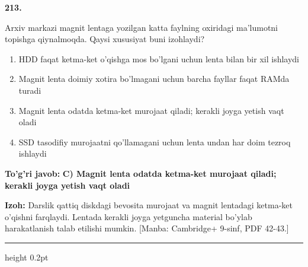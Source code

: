 \documentclass[10pt,a4paper]{article}
\begin{document}
{\bfseries\sffamily\color{ink} 213.}
\par
Arxiv markazi magnit lentaga yozilgan katta faylning oxiridagi ma'lumotni topishga qiynalmoqda. Qaysi xususiyat buni izohlaydi?
\begin{enumerate}[label=\Alph*),leftmargin=9mm]
\item HDD faqat ketma-ket o'qishga mos bo'lgani uchun lenta bilan bir xil ishlaydi
\item Magnit lenta doimiy xotira bo'lmagani uchun barcha fayllar faqat RAMda turadi
\item Magnit lenta odatda ketma-ket murojaat qiladi; kerakli joyga yetish vaqt oladi
\item SSD tasodifiy murojaatni qo'llamagani uchun lenta undan har doim tezroq ishlaydi
\end{enumerate}
\begin{tcolorbox}[enhanced,breakable,colback=teal!4,colframe=teal!60!black,boxrule=0.45pt,arc=1.2mm,left=2.7mm,right=2.7mm,top=1.8mm,bottom=1.8mm,before skip=2mm,after skip=2mm]
{\bfseries\sffamily\color{teal}To'g'ri javob:} \textbf{C) Magnit lenta odatda ketma-ket murojaat qiladi; kerakli joyga yetish vaqt oladi}
\par\smallskip
{\bfseries Izoh:} Darslik qattiq diskdagi bevosita murojaat va magnit lentadagi ketma-ket o'qishni farqlaydi. Lentada kerakli joyga yetguncha material bo'ylab harakatlanish talab etilishi mumkin. [Manba: Cambridge+ 9-sinf, PDF 42-43.]
\end{tcolorbox}
\vspace{2mm}\hrule height 0.2pt\vspace{3mm}
\end{document}
